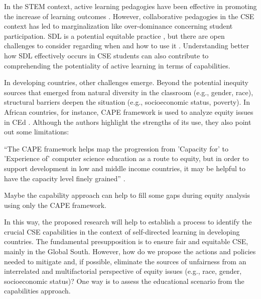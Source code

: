 In the \gls{STEM} context, active learning pedagogies have been effective in promoting the increase of learning outcomes \cite{prince:2004}. However, collaborative pedagogies in the \gls{CSE} context has led to marginalization \cite{lewis:2015} like over-dominance concerning student participation. \acrfull{SDL} is a potential equitable practice \cite{anderson:2022}, but there are open challenges to consider regarding when and how to use it \cite{brookfield:1993}. Understanding better how \gls{SDL} effectively occurs in \gls{CSE} students can also contribute to comprehending the potentiality of active learning in terms of capabilities.

In developing countries, other challenges emerge. Beyond the potential inequity sources that emerged from natural diversity in the classroom (e.g., gender, race), structural barriers deepen the situation (e.g., socioeconomic status, poverty). In African countries, for instance, \gls{CAPE} framework is used to analyze equity issues in \gls{CEd} \cite{tshukudu:2023}. Although the authors highlight the strengths of its use, they also point out some limitations: 
\begin{citacao}
    ``The \gls{CAPE} framework helps map the progression from 'Capacity for' to 'Experience of' computer science education as a route to equity, but in order to support development in low and middle income countries, it may be helpful to have the capacity level finely grained'' \cite[p.~1]{tshukudu:2023}.
\end{citacao}
Maybe the capability approach can help to fill some gaps during equity analysis using only the \gls{CAPE} framework.

 In this way, the proposed research will help to establish a process to identify the crucial \gls{CSE} capabilities in the context of self-directed learning in developing countries. The fundamental presupposition is to ensure fair and equitable \gls{CSE}, mainly in the Global South. However, how do we propose the actions and policies needed to mitigate and, if possible, eliminate the sources of unfairness from an interrelated and multifactorial perspective of equity issues (e.g., race, gender, socioeconomic status)? One way is to assess the educational scenario from the capabilities approach.